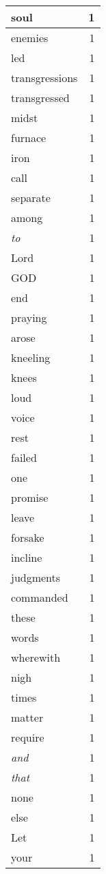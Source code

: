\begin{center}
\begin{longtable}{l|r}
soul & 1 \\ \hline
enemies & 1 \\ \hline
led & 1 \\ \hline
transgressions & 1 \\ \hline
transgressed & 1 \\ \hline
midst & 1 \\ \hline
furnace & 1 \\ \hline
iron & 1 \\ \hline
call & 1 \\ \hline
separate & 1 \\ \hline
among & 1 \\ \hline
\emph{to} & 1 \\ \hline
Lord & 1 \\ \hline
GOD & 1 \\ \hline
end & 1 \\ \hline
praying & 1 \\ \hline
arose & 1 \\ \hline
kneeling & 1 \\ \hline
knees & 1 \\ \hline
loud & 1 \\ \hline
voice & 1 \\ \hline
rest & 1 \\ \hline
failed & 1 \\ \hline
one & 1 \\ \hline
promise & 1 \\ \hline
leave & 1 \\ \hline
forsake & 1 \\ \hline
incline & 1 \\ \hline
judgments & 1 \\ \hline
commanded & 1 \\ \hline
these & 1 \\ \hline
words & 1 \\ \hline
wherewith & 1 \\ \hline
nigh & 1 \\ \hline
times & 1 \\ \hline
matter & 1 \\ \hline
require & 1 \\ \hline
\emph{and} & 1 \\ \hline
\emph{that} & 1 \\ \hline
none & 1 \\ \hline
else & 1 \\ \hline
Let & 1 \\ \hline
your & 1 \\ \hline

\end{longtable}
\end{center}
